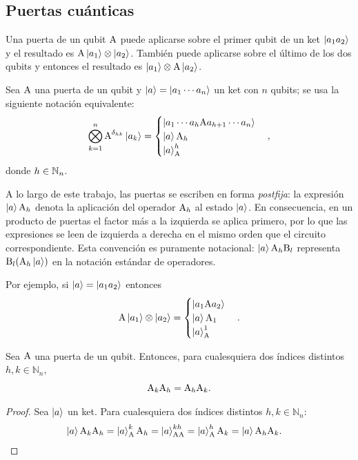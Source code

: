\subsection{Puertas cuánticas}
Una puerta de un qubit $\text{A}$ puede aplicarse sobre el primer qubit de un ket $\ket{a_1 a_2}$ y el resultado es $\text{A}\ket{a_1}\otimes \ket{a_2}$.
También puede aplicarse sobre el último de los dos qubits y entonces el resultado es $\ket{a_1}\otimes \text{A}\ket{a_2}$.

\begin{notation}
	Sea $\text{A}$ una puerta de un qubit y $\ket{a}=\ket{a_1\cdots a_n}$ un ket con $n$ qubits; se usa la siguiente notación equivalente:
	\[
		\bigotimes_{k=1}^n\text{A}^{\delta_{hk}}\ket{a_k}=
		\begin{cases}
			\ket{a_1\cdots a_h\text{A}a_{h+1}\cdots a_n}\\
			\ket{a}\text{A}_h\\
			\ket{a}^{h}_{\text{A}}
		\end{cases}
		,
	\]
	donde $h\in\mathbb{N}_n$.
\end{notation}

\begin{remark}
	A lo largo de este trabajo, las puertas se escriben en forma \emph{postfija}: la
	expresión $\ket{a}\text{A}_h$ denota la aplicación del operador
	$\text{A}_h$ al estado $\ket{a}$. En consecuencia, en un producto de puertas
	el factor más a la izquierda se aplica primero, por lo que las expresiones se leen de izquierda
	a derecha en el mismo orden que el circuito correspondiente. Esta convención
	es puramente notacional: $\ket{a}\text{A}_h\text{B}_l$ representa
	$\text{B}_l(\text{A}_h\ket{a})$ en la notación estándar de operadores.
\end{remark}
Por ejemplo, si $\ket{a}=\ket{a_1 a_2}$ entonces
\[
	\text{A}\ket{a_1}\otimes \ket{a_2} =
	\begin{cases}
		\ket{a_1\text{A}a_2}\\
		\ket{a}\text{A}_1\\
		\ket{a}^{1}_{\text{A}}
	\end{cases}.
\]

\begin{proposition}
	Sea $\text{A}$ una puerta de un qubit.
	Entonces, para cualesquiera dos índices distintos $h,k \in \mathbb{N}_n$,
	\begin{equation}
		\label{eq:conmutacion-gates}
		\text{A}_k\text{A}_{h} = \text{A}_{h}\text{A}_k.
	\end{equation}

\end{proposition}
\begin{proof}
	Sea $\ket{a}$ un ket.
	Para cualesquiera dos índices distintos $h,k \in \mathbb{N}_n$:
	\begin{align*}
		\ket{a}\text{A}_k\text{A}_{h}
		&=\ket{a}^{k}_{\text{A}}\text{A}_{h}=\ket{a}^{kh}_{\text{AA}}=\ket{a}^{h}_{\text{A}}\text{A}_{k}=\ket{a}\text{A}_{h}\text{A}_k.
	\end{align*}
\end{proof}

